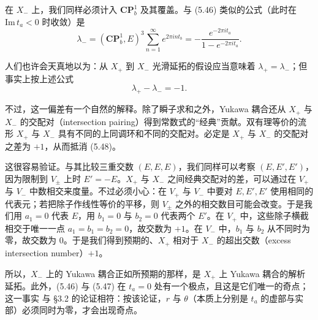 \label{op:74}

在 $X_{-}$ 上，我们同样必须计入 $\mathbf{CP}^{1}_{b}$ 及其覆盖。与 (5.46) 类似的公式（此时在 $\mathrm{Im}\,t_{a}<0$ 时收敛）是
\begin{equation}
\tag{5.47}
\lambda_{-}=(\mathbf{CP}^{1}_{b},E)^{3}\sum_{n=1}^{\infty}e^{2\pi i n t_{b}}=-\frac{e^{-2\pi i t_{a}}}{1-e^{-2\pi i t_{a}}}.
\end{equation}

人们也许会天真地以为：从 $X_{+}$ 到 $X_{-}$ 光滑延拓的假设应当意味着 $\lambda_{+}=\lambda_{-}$；但事实上按上述公式
\begin{equation}
\tag{5.48}
\lambda_{+}-\lambda_{-}=-1.
\end{equation}


不过，这一偏差有一个自然的解释。除了瞬子求和之外，Yukawa 耦合还从 $X_{+}$ 与 $X_{-}$ 的交配对（intersection pairing）得到常数式的“经典”贡献。双有理等价的流形 $X_{+}$ 与 $X_{-}$ 具有不同的上同调环和不同的交配对。必定是 $X_{+}$ 与 $X_{-}$ 的交配对之差为 $+1$，从而抵消 (5.48)。

这很容易验证。与其比较三重交数 $(E,E,E)$，我们同样可以考察 $(E,E',E')$，因为限制到 $V_{\pm}$ 上时 $E'=-E$。$X_{+}$ 与 $X_{-}$ 之间经典交配对的差，可以通过在 $V_{+}$ 与 $V_{-}$ 中数相交来度量。不过必须小心：在 $V_{+}$ 与 $V_{-}$ 中要对 $E,E',E'$ 使用相同的代表元；若把除子作线性等价的平移，则 $V_{\pm}$ 之外的相交数目可能会改变。于是我们用 $a_{1}=0$ 代表 $E$，用 $b_{1}=0$ 与 $b_{2}=0$ 代表两个 $E'$。在 $V_{+}$ 中，这些除子横截相交于唯一一点 $a_{1}=b_{1}=b_{2}=0$，故交数为 $+1$。在 $V_{-}$ 中，$b_{1}$ 与 $b_{2}$ 从不同时为零，故交数为 $0$。于是我们得到预期的、$X_{+}$ 相对于 $X_{-}$ 的超出交数（excess intersection number）$+1$。


所以，$X_{-}$ 上的 Yukawa 耦合正如所预期的那样，是 $X_{+}$ 上 Yukawa 耦合的解析延拓。此外，(5.46) 与 (5.47) 在 $t_{a}=0$ 处有一个极点，且这是它们唯一的奇点；这一事实
\label{op:75}
与 §3.2 的论证相符：按该论证，$r$ 与 $\theta$（本质上分别是 $t_{a}$ 的虚部与实部）必须同时为零，才会出现奇点。


